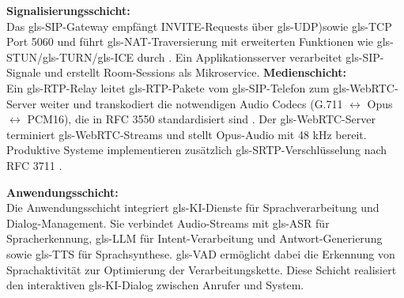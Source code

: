 \textbf{Signalisierungsschicht:}\\
Das \gls{gls-SIP}-Gateway \parencite{rfc3261} empfängt INVITE-Requests über \gls{gls-UDP})sowie \gls{gls-TCP} Port 5060 und führt \gls{gls-NAT}-Traversierung mit erweiterten Funktionen wie \gls{gls-STUN}/\gls{gls-TURN}/\gls{gls-ICE} durch \parencite{rfc5389, rfc5766, rfc5245}. Ein Applikationsserver verarbeitet \gls{gls-SIP}-Signale und erstellt Room-Sessions als Mikroservice.
\clearpage
\textbf{Medienschicht:}\\
Ein \gls{gls-RTP}-Relay leitet \gls{gls-RTP}-Pakete vom \gls{gls-SIP}-Telefon zum \gls{gls-WebRTC}-Server weiter und transkodiert die notwendigen Audio Codecs (G.711 $\leftrightarrow$ Opus $\leftrightarrow$ PCM16), die in RFC 3550 standardisiert sind \parencite{rfc3550}. Der \gls{gls-WebRTC}-Server terminiert \gls{gls-WebRTC}-Streams und stellt Opus-Audio mit 48 kHz bereit. Produktive Systeme implementieren zusätzlich \gls{gls-SRTP}-Verschlüsselung nach RFC 3711 \parencite{rfc3711}.

\textbf{Anwendungsschicht:}\\
Die Anwendungsschicht integriert \gls{gls-KI}-Dienste für Sprachverarbeitung und Dialog-Management. Sie verbindet Audio-Streams mit \gls{gls-ASR} für Spracherkennung, \gls{gls-LLM} für Intent-Verarbeitung und Antwort-Generierung sowie \gls{gls-TTS} für Sprachsynthese. \gls{gls-VAD} ermöglicht dabei die Erkennung von Sprachaktivität zur Optimierung der Verarbeitungskette. Diese Schicht realisiert den interaktiven \gls{gls-KI}-Dialog zwischen Anrufer und System.\parencite{Antonova2025,rfc3551,rfc3550}

